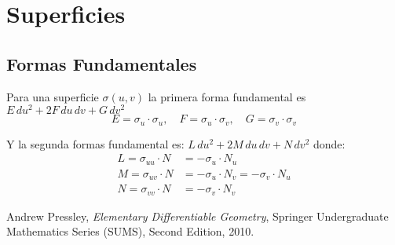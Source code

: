 \documentclass{article}
\numberwithin{equation}{section}
\begin{document}
\section{Superficies}
\subsection{Formas Fundamentales}
Para una superficie $\sigma(u,v)$ la primera forma fundamental es $E\,du^2 + 2F\,du\,dv + G\,dv^2$ 
    \[E = \sigma_u\cdot \sigma_u, \quad 
    F = \sigma_u\cdot \sigma_v, \quad 
    G = \sigma_v\cdot \sigma_v \]

Y  la segunda formas fundamental es: $L\,du^2 + 2M\,du\,dv + N\,dv^2$ donde:
\begin{subequations}
\begin{align}
 L = \sigma_{uu} \cdot N &= -\sigma_u\cdot N_u \\
 M = \sigma_{uv} \cdot N &= -\sigma_u\cdot N_v = -\sigma_v\cdot N_u\\
    N = \sigma_{vv} \cdot N &= -\sigma_v\cdot N_v 
\end{align}
\end{subequations}

\begin{thebibliography}{9}
Andrew Pressley,
\emph{Elementary Differentiable Geometry},
Springer Undergraduate Mathematics Series (SUMS),
Second Edition, 
2010.

\end{thebibliography}
\end{document}
